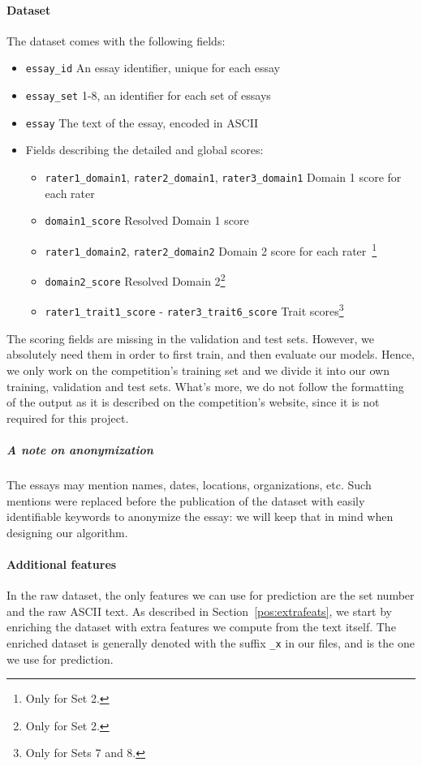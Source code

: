 \documentclass[a4paper,12pt,english]{article}
\begin{document}
\paragraph{Dataset} The dataset comes with the following fields:
\begin{itemize}
	\item \verb|essay_id| An essay identifier, unique for each essay
	\item \verb|essay_set| 1-8, an identifier for each set of essays
	\item \verb|essay| The text of the essay, encoded in ASCII
	\item Fields describing the detailed and global scores: 
	\begin{itemize}
		\item \verb|rater1_domain1|, \verb|rater2_domain1|, \verb|rater3_domain1| Domain 1 score for each rater
		\item \verb|domain1_score| Resolved Domain 1 score
		\item \verb|rater1_domain2|, \verb|rater2_domain2| Domain 2 score for each rater~\footnote{Only for Set 2.}
		\item \verb|domain2_score| Resolved Domain 2\footnote{Only for Set 2.}
		\item \verb|rater1_trait1_score| - \verb|rater3_trait6_score| Trait scores\footnote{Only for Sets 7 and 8.}
	\end{itemize}
\end{itemize}
The scoring fields are missing in the validation and test sets. However, we absolutely need them in order to first train, and then evaluate our models. Hence, we only work on the competition's training set and we divide it into our own training, validation and test sets. What's more, we do not follow the formatting of the output as it is described on the competition's website, since it is not required for this project. 
\subparagraph{A note on anonymization} The essays may mention names, dates, locations, organizations, etc. Such mentions were replaced before the publication of the dataset with easily identifiable keywords to anonymize the essay: we will keep that in mind when designing our algorithm.

\paragraph{Additional features} In the raw dataset, the only features we can use for prediction are the set number and the raw ASCII text. As described in Section~\ref{pos:extrafeats}, we start by enriching the dataset with extra features we compute from the text itself. The enriched dataset is generally denoted with the suffix \verb|_x| in our files, and is the one we use for prediction.
\end{document}
